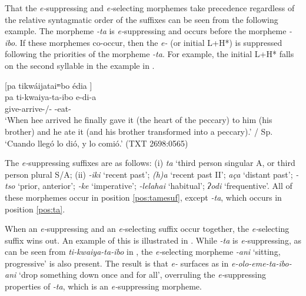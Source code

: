 \documentclass[output=paper,hidelinks]{langscibook}
\begin{document}
That the \textit{e-}suppressing and \textit{e-}selecting morphemes take precedence regardless of the relative syntagmatic order of the suffixes can be seen from the following example. The morpheme \textit{-ta} is \textit{e-}suppressing and occurs before the morpheme \textit{-ibo}. If these morphemes co-occur, then the \textit{e-} (or initial L+H*) is suppressed following the priorities of the morpheme \textit{-ta}. For example, the initial L+H* falls on the second syllable in the example in .

\ea \label{ex:tikwaiyatibo}
	  [pa tikwáijataiᵐbo édia  \downarrow] \\
       \gll pa ti-kwaiya-ta-ibo e-di-a \\
	    \Rep{} give-arrive-\Third\Aarg{}/\Tpl{}-\Final{} \E{}-eat-\E{}  \\
    \glt `When hee arrived he finally gave it (the heart of the peccary) to him (his brother) and he ate it (and his brother transformed into a peccary).' / Sp. `Cuando llegó lo dió, y lo comió.' \hfill (TXT 2698:0565)
\z

The \textit{e-}suppressing suffixes are as follows: (i) \textit{ta} `third person singular A, or third person plural S/A; (ii) \textit{-iki} `recent past'; \textit{(h)a} `recent past II'; \textit{aça} `distant past'; \textit{-tso} `prior, anterior'; \textit{-ke} `imperative'; \textit{-lelahai} `habitual'; \textit{ʔodi} `frequentive'. All of these morphemes occur in position \ref{pos:tamesuf}, except \textit{-ta}, which occurs in position \ref{pos:ta}.

When an \textit{e-}suppressing and an \textit{e-}selecting suffix occur together, the \textit{e-}selecting suffix wins out. An example of this is illustrated in . While \textit{-ta} is \textit{e-}suppressing, as can be seen from \textit{ti-kwaiya-ta-ibo} in , the \textit{e-}selecting morpheme \textit{-ani} `sitting, progressive' is also present. The result is that \textit{e-} surfaces as in \textit{e-olo-eme-ta-ibo-ani} `drop something down once and for all', overruling the \textit{e-}suppressing properties of \textit{-ta}, which is an \textit{e-}suppressing morpheme.
\end{document}
